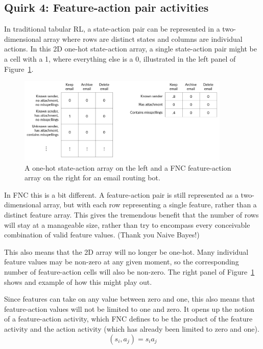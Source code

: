\subsection*{Quirk 4: Feature-action pair activities}
\label{algofeatureactionactivity}

In traditional tabular RL, a state-action pair can be represented in a
two-dimensional array where rows are distinct states and columns are
individual actions. In this 2D one-hot state-action array, a single state-action
pair might be a cell with a 1, where everything else is a 0, illustrated in
the left panel of Figure~\ref{fig:feature_action_array}.

\begin{figure}[ht]
\vskip 0.2in
\begin{center}
\centerline{\includegraphics[width=0.9\textwidth]{images/feature_action_array.png}}
\caption{A one-hot state-action array on the left and a FNC feature-action
array on the right for an email routing bot.}
\label{fig:feature_action_array}
\end{center}
\vskip -0.2in
\end{figure}

In FNC this is a bit different. A feature-action pair is still represented
as a two-dimensional array, but with each row representing a single
feature, rather than a distinct feature array. This gives the tremendous
benefit that the number of rows will stay at a manageable size,
rather than try to encompass every conceivable combination of valid
feature values. (Thank you Naive Bayes!)

This also means that the 2D array will no longer be one-hot.
Many individual feature values may be non-zero at any given moment,
so the corresponding number of feature-action cells will also be non-zero.
The right panel of Figure~\ref{fig:feature_action_array} shows
and example of how this might play out.

Since features can take on any value between zero and one, this also
means that feature-action values will not be limited to one and zero.
It opens up the notion of a feature-action activity, which FNC defines
to be the product of the feature activity and the action activity
(which has already been limited to zero and one).
\begin{equation}
(s_i, a_j) = s_i a_j
\end{equation}


